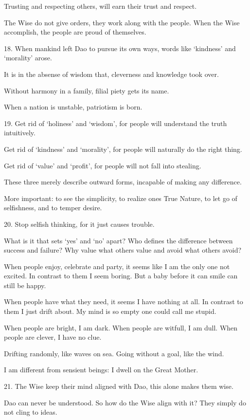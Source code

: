 \documentclass[10pt,a4paper]{book}
\begin{document}
Trusting and respecting others,
will earn their trust and respect.

The Wise do not give orders,
they work along with the people.
When the Wise accomplish,
the people are proud of themselves.


18.
When mankind left Dao to pursue its own ways,
words like `kindness' and `morality' arose.

It is in the absense of wisdom that,
cleverness and knowledge took over.

Without harmony in a family,
filial piety gets its name.

When a nation is unstable,
patriotism is born.


19.
Get rid of `holiness' and `wisdom', for
people will understand the truth intuitively.

Get rid of `kindness' and `morality', for
people will naturally do the right thing.

Get rid of `value' and `profit', for
people will not fall into stealing.

These three merely describe outward forms,
incapable of making any difference.

More important:
to see the simplicity,
to realize ones True Nature,
to let go of selfishness, and
to temper desire.


20.
Stop selfish thinking, for it just causes trouble.

What is it that sets `yes' and `no' apart?
Who defines the difference between success and failure?
Why value what others value and avoid what others avoid?

When people enjoy, celebrate and party,
it seems like I am the only one not excited.
In contrast to them I seem boring.
But a baby before it can smile can still be happy.

When people have what they need,
it seems I have nothing at all.
In contrast to them I just drift about.
My mind is so empty one could call me stupid.

When people are bright, I am dark.
When people are witfull, I am dull.
When people are clever, I have no clue.

Drifting randomly, like waves on sea.
Going without a goal, like the wind.

I am different from sensient beings:
I dwell on the Great Mother.


21.
The Wise keep their mind aligned with Dao,
this alone makes them wise.

Dao can never be understood.
So how do the Wise align with it?
They simply do not cling to ideas.
\end{document}
